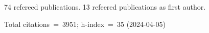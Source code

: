 74 refereed publications. 13 refeered publications as first author.

Total citations~=~3951; h-index~=~35 (2024-04-05)